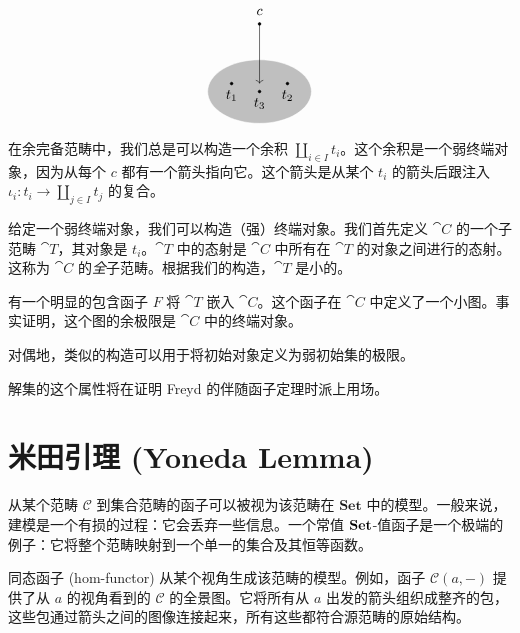 \documentclass[DaoFP]{subfiles}
\begin{document}
\[
\begin{tikzpicture}
        \filldraw (0, 1.5) circle (1pt);
        \node at (0, 1.8) {$c$};
        
\filldraw[fill=gray!50, draw=white] (0, -0.2) ellipse (1.3 and 0.8);
        \filldraw (-0.7, 0) circle (1pt);
        \node at (-0.7, -0.3) {$t_1$};
        \filldraw (0.7, 0) circle (1pt);
        \node at (0.7, -0.3) {$t_2$};
        \filldraw (0, -0.2) circle (1pt);
        \node at (0, -0.5) {$t_3$};
        
    	\draw[->] (0, 1.5) -- (0, 0);
\end{tikzpicture}
\]

在余完备范畴中，我们总是可以构造一个余积 $\coprod_{i \in I} t_i$。这个余积是一个弱终端对象，因为从每个 $c$ 都有一个箭头指向它。这个箭头是从某个 $t_i$ 的箭头后跟注入 $\iota_i \colon t_i \to \coprod_{j \in I} t_j$ 的复合。

给定一个弱终端对象，我们可以构造（强）终端对象。我们首先定义 $\cat C$ 的一个子范畴 $\cat T$，其对象是 $t_i$。$\cat T$ 中的态射是 $\cat C$ 中所有在 $\cat T$ 的对象之间进行的态射。这称为 $\cat C$ 的\emph{全}子范畴。根据我们的构造，$\cat T$ 是小的。

有一个明显的包含函子 $F$ 将 $\cat T$ 嵌入 $\cat C$。这个函子在 $\cat C$ 中定义了一个小图。事实证明，这个图的余极限是 $\cat C$ 中的终端对象。

对偶地，类似的构造可以用于将初始对象定义为弱初始集的极限。

解集的这个属性将在证明 Freyd 的伴随函子定理时派上用场。

\section{米田引理 (Yoneda Lemma)}

从某个范畴 $\mathcal{C}$ 到集合范畴的函子可以被视为该范畴在 $\mathbf{Set}$ 中的模型。一般来说，建模是一个有损的过程：它会丢弃一些信息。一个常值 $\mathbf{Set}$-值函子是一个极端的例子：它将整个范畴映射到一个单一的集合及其恒等函数。

同态函子 (hom-functor) 从某个视角生成该范畴的模型。例如，函子 $\mathcal{C}(a, -)$ 提供了从 $a$ 的视角看到的 $\mathcal{C}$ 的全景图。它将所有从 $a$ 出发的箭头组织成整齐的包，这些包通过箭头之间的图像连接起来，所有这些都符合源范畴的原始结构。
\end{document}
